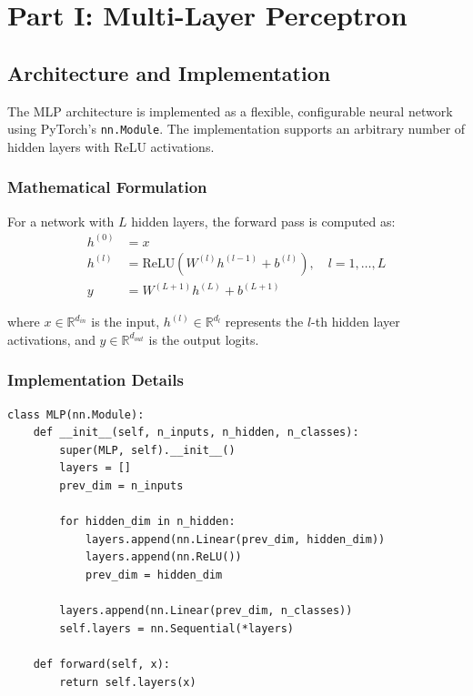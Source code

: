 \documentclass[11pt,a4paper]{article}
\begin{document}
\section{Part I: Multi-Layer Perceptron}

\subsection{Architecture and Implementation}

The MLP architecture is implemented as a flexible, configurable neural network using PyTorch's \texttt{nn.Module}. The implementation supports an arbitrary number of hidden layers with ReLU activations.

\subsubsection{Mathematical Formulation}

For a network with $L$ hidden layers, the forward pass is computed as:
\begin{align}
    h^{(0)} &= x \\
    h^{(l)} &= \text{ReLU}(W^{(l)} h^{(l-1)} + b^{(l)}), \quad l = 1, \ldots, L \\
    y &= W^{(L+1)} h^{(L)} + b^{(L+1)}
\end{align}

where $x \in \mathbb{R}^{d_{in}}$ is the input, $h^{(l)} \in \mathbb{R}^{d_l}$ represents the $l$-th hidden layer activations, and $y \in \mathbb{R}^{d_{out}}$ is the output logits.

\subsubsection{Implementation Details}

\begin{lstlisting}[caption={MLP Implementation}]
class MLP(nn.Module):
    def __init__(self, n_inputs, n_hidden, n_classes):
        super(MLP, self).__init__()
        layers = []
        prev_dim = n_inputs
        
        for hidden_dim in n_hidden:
            layers.append(nn.Linear(prev_dim, hidden_dim))
            layers.append(nn.ReLU())
            prev_dim = hidden_dim
        
        layers.append(nn.Linear(prev_dim, n_classes))
        self.layers = nn.Sequential(*layers)
    
    def forward(self, x):
        return self.layers(x)
\end{lstlisting}
\end{document}
